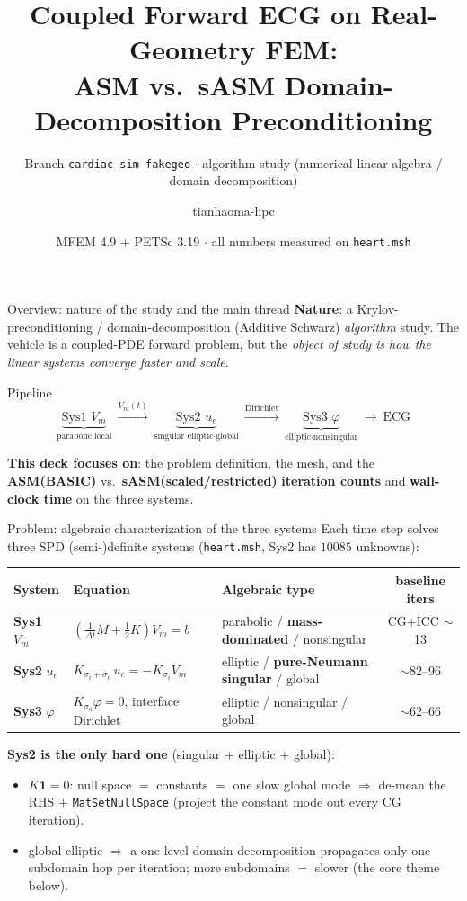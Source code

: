\documentclass[aspectratio=169,11pt]{beamer}
\title[cardiac-sim-fakegeo]{Coupled Forward ECG on Real-Geometry FEM:\\ASM vs.\ sASM Domain-Decomposition Preconditioning}
\subtitle{Branch \texttt{cardiac-sim-fakegeo} $\cdot$ algorithm study (numerical linear algebra / domain decomposition)}
\author{tianhaoma-hpc}
\date{MFEM 4.9 + PETSc 3.19 $\cdot$ all numbers measured on \texttt{heart.msh}}
\begin{document}
\begin{frame}\titlepage\end{frame}

\begin{frame}{Overview: nature of the study and the main thread}
\textbf{Nature}: a Krylov-preconditioning / domain-decomposition (Additive Schwarz) \emph{algorithm} study. The vehicle is a coupled-PDE forward problem, but the \emph{object of study is how the linear systems converge faster and scale}.
\vspace{0.6em}
\begin{block}{Pipeline}
\[
\underbrace{\text{Sys1 } V_m}_{\text{parabolic}\cdot\text{local}}\ \xrightarrow{V_m(t)}\
\underbrace{\text{Sys2 } u_e}_{\text{singular elliptic}\cdot\text{global}}\ \xrightarrow{\text{Dirichlet}}\
\underbrace{\text{Sys3 } \varphi}_{\text{elliptic}\cdot\text{nonsingular}}\ \to\ \text{ECG}
\]
\end{block}
\textbf{This deck focuses on}: the problem definition, the mesh, and the \textbf{ASM(BASIC)} vs.\ \textbf{sASM(scaled/restricted)} \textbf{iteration counts} and \textbf{wall-clock time} on the three systems.
\end{frame}

\begin{frame}{Problem: algebraic characterization of the three systems}
Each time step solves three SPD (semi-)definite systems (\texttt{heart.msh}, Sys2 has $10085$ unknowns):
\vspace{0.4em}
\begin{table}\small
\begin{tabular}{@{}lllc@{}}
\toprule
System & Equation & Algebraic type & baseline iters \\
\midrule
\textbf{Sys1} $V_m$ & $\left(\tfrac1{\Delta t}M+\tfrac12K\right)V_m=b$ & parabolic / \textbf{mass-dominated} / nonsingular & CG+ICC $\sim$13 \\
\textbf{Sys2} $u_e$ & $K_{\sigma_i+\sigma_e}\,u_e=-K_{\sigma_i}V_m$ & elliptic / \textbf{pure-Neumann singular} / global & $\sim$82--96 \\
\textbf{Sys3} $\varphi$ & $K_{\sigma_o}\varphi=0$, interface Dirichlet & elliptic / nonsingular / global & $\sim$62--66 \\
\bottomrule
\end{tabular}
\end{table}
\vspace{0.3em}
\textbf{Sys2 is the only hard one} (singular $+$ elliptic $+$ global):
\begin{itemize}
\item $K\mathbf{1}=0$: null space $=$ constants $=$ one slow global mode $\Rightarrow$ de-mean the RHS $+$ \texttt{MatSetNullSpace} (project the constant mode out every CG iteration).
\item global elliptic $\Rightarrow$ a one-level domain decomposition propagates only one subdomain hop per iteration; more subdomains $=$ slower (the core theme below).
\end{itemize}
\end{frame}
\end{document}
